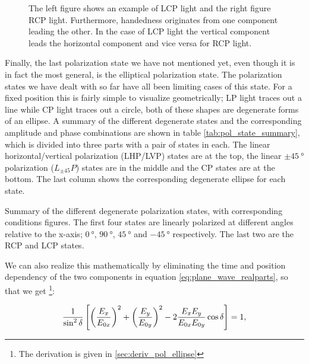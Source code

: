 \begin{figure}
\centering
\subcaptionbox{\label{fig:circ_pol_planewave_a}}
    {}
\subcaptionbox{\label{fig:circ_pol_planewave_b}}
    {}
\caption{The left figure shows an example of LCP light and the right figure RCP light. Furthermore, handedness originates from one component leading the other. In the case of LCP light the vertical component leads the horizontal component and vice versa for RCP light.}
\label{fig:circ_pol_planewave}
\end{figure}

Finally, the last polarization state we have not mentioned yet, even though it is in fact the most general, is the elliptical polarization state. The polarization states we have dealt with so far have all been limiting cases of this state. For a fixed position this is fairly simple to visualize geometrically; LP light traces out a line while CP light traces out a circle, both of these shapes are degenerate forms of an ellipse. A summary of the different degenerate states and the corresponding amplitude and phase combinations are shown in table \ref{tab:pol_state_summary}, which is divided into three parts with a pair of states in each. The linear horizontal/vertical polarization (LHP/LVP) states are at the top, the linear $\pm\SI{45}{\degree}$ polarization ($L_{\pm45}P$) states are in the middle and the CP states are at the bottom. The last column shows the corresponding degenerate ellipse for each state.

\begin{table}[h]
    \centering
    
    \caption{Summary of the different degenerate polarization states, with corresponding conditions figures. The first four states are linearly polarized at different angles relative to the x-axis; $\SI{0}{\degree}$, $\SI{90}{\degree}$, $\SI{45}{\degree}$ and $\SI{-45}{\degree}$ respectively. The last two are the RCP and LCP states.}
    \label{tab:pol_state_summary}
\end{table}

We can also realize this mathematically by eliminating the time and position dependency of the two components in equation \ref{eq:plane_wave_realparts}, so that we get \footnote{The derivation is given in \ref{sec:deriv_pol_ellipse}}:

\begin{equation}
    \centering
    \label{eq:pol_ellipse}
    \frac{1}{\sin^2 \delta} \left[ \left(\frac{E_x}{E_{0x}}\right)^2+\left(\frac{E_y}{E_{0y}}\right)^2-2\frac{E_x E_y}{E_{0x} E_{0y}}\cos \delta \right]=1,
\end{equation}

